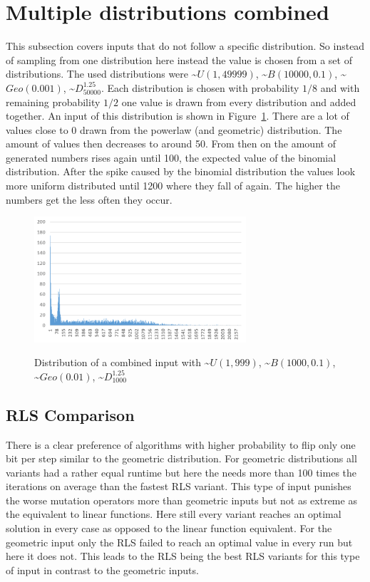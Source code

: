\section{Multiple distributions combined}
This subsection covers inputs that do not follow a specific distribution.
So instead of sampling from one distribution here instead the value is chosen from a set of distributions.
The used distributions were \textasciitilde$U(1,49999)$, \textasciitilde$B(10000,0.1)$, \textasciitilde$Geo(0.001)$, \textasciitilde$D^{1.25}_{50000}$.
Each distribution is chosen with probability $1/8$ and with remaining probability $1/2$ one value is drawn from every distribution and added together.
An input of this distribution is shown in Figure~\ref{fig:mixAndOverlDistExample}.
There are a lot of values close to 0 drawn from the powerlaw (and geometric) distribution.
The amount of values then decreases to around 50.
From then on the amount of generated numbers rises again until 100, the expected value of the binomial distribution.
After the spike caused by the binomial distribution the values look more uniform distributed until 1200 where they fall of again.
The higher the numbers get the less often they occur.

\begin{figure}[h]
      \caption{Distribution of a combined input with \textasciitilde$U(1,999)$, \textasciitilde$B(1000,0.1)$, \textasciitilde$Geo(0.01)$, \textasciitilde$D^{1.25}_{1000}$}
      \centering
      \includegraphics[width=0.7\textwidth]{figures/images/numberGenerator/mixedAndOverlapped.png}\label{fig:mixAndOverlDistExample}
\end{figure}

\subsection{RLS Comparison}


There is a clear preference of algorithms with higher probability to flip only one bit per step similar to the geometric distribution.
For geometric distributions all variants had a rather equal runtime but here the \RLSN[4] needs more than 100 times the iterations on average than the fastest RLS variant.
This type of input punishes the worse mutation operators more than geometric inputs but not as extreme as the equivalent to linear functions.
Here still every variant reaches an optimal solution in every case as opposed to the linear function equivalent.
For the geometric input only the RLS failed to reach an optimal value in every run but here it does not.
This leads to the RLS being the best RLS variants for this type of input in contrast to the geometric inputs.
